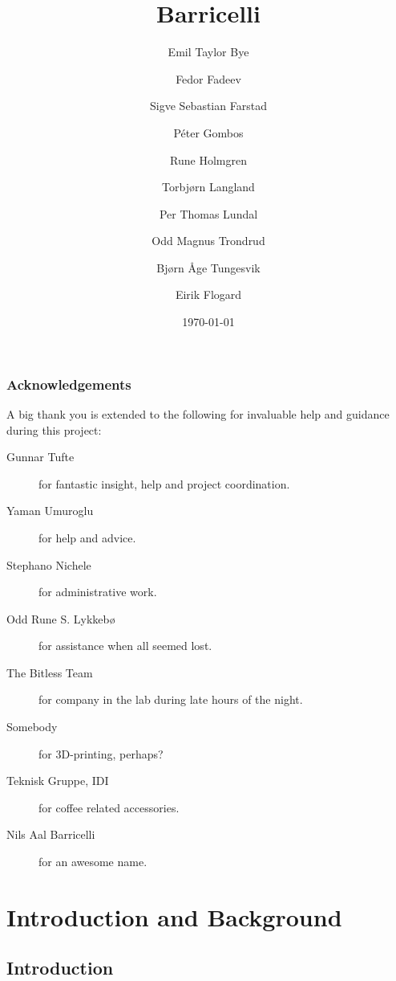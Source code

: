 \documentclass[a4paper]{report}
\title{Barricelli}
\date{\today}
\author{Emil Taylor Bye
     \and Fedor Fadeev
     \and Sigve Sebastian Farstad
     \and Péter Gombos
     \and Rune Holmgren
     \and Torbjørn Langland
     \and Per Thomas Lundal
     \and Odd Magnus Trondrud
     \and Bjørn Åge Tungesvik
     \and Eirik Flogard
}
\begin{document}



\newpage
\thispagestyle{empty}
\mbox{}
\newpage

\begin{abstract}
	
\end{abstract}

\thispagestyle{empty}
\section*{Acknowledgements}
A big thank you is extended to the following for invaluable help and guidance during this project:

\begin{description}
\item[Gunnar Tufte] for fantastic insight, help and project coordination.
\item[Yaman Umuroglu] for help and advice.
\item[Stephano Nichele] for administrative work.
\item[Odd Rune S. Lykkebø] for assistance when all seemed lost.
\item[The Bitless Team] for company in the lab during late hours of the night.
\item[Somebody] for 3D-printing, perhaps?
\item[Teknisk Gruppe, IDI] for coffee related accessories.
\item[Nils Aal Barricelli] for an awesome name.
\end{description}

\setcounter{page}{3}

\tableofcontents
\newpage

\listoffigures
\listoftables
\listofalgorithms
\renewcommand{\lstlistlistingname}{List of Listings}

\newpage
\setcounter{page}{1}

\part{Introduction and Background}

\chapter{Introduction}
	
\end{document}
